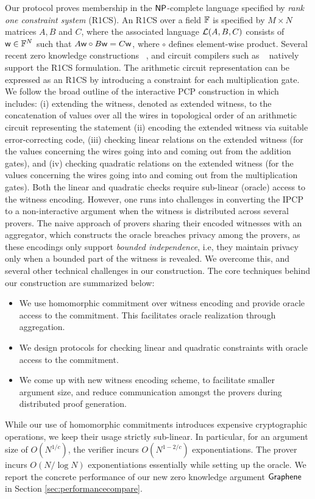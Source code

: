 Our protocol proves membership in the $\mathsf{NP}$-complete
language specified by {\em rank one constraint system} (R1CS). An R1CS over a
field $\mathbb{F}$ is specified by $M\times N$ matrices $A,B$ and $C$, where the
associated language $\mathcal{L}(A,B,C)$ consists of $\mathsf{w}\in \mathbb{F}^N$ such that
$A\mathsf{w}\circ B\mathsf{w}=C\mathsf{w}$, where $\circ$ defines element-wise product. Several
recent zero knowledge constructions ~\cite{Groth16,aurora,marlin}, and 
circuit compilers such as ~\cite{zokrates} natively support the R1CS formulation. 
The arithmetic circuit representation can  be
expressed as an R1CS by introducing a constraint for each multiplication gate.
We follow the broad outline of the interactive PCP
construction in \cite{ligero} which includes: (i) extending the witness, denoted as extended witness, to the concatenation of values over all the wires in topological order of an arithmetic circuit  representing the statement   (ii) encoding the extended witness via suitable
error-correcting code, (iii) checking linear relations on the extended witness (for the values concerning the wires going into and coming out from the addition gates), and
(iv) checking quadratic relations on
the extended witness  (for the values concerning the wires going into and coming out from the multiplication gates). Both the linear and quadratic checks require sub-linear (oracle) access to the 
witness encoding.
However, one runs into 
challenges in converting the IPCP to a non-interactive
argument when the witness is distributed across several provers. The naive
approach of provers sharing their encoded witnesses with an aggregator, which
constructs the oracle breaches privacy among the provers, as these encodings
only support {\em bounded independence}, i.e, they maintain privacy only when a
bounded part of the witness is revealed. We overcome this, and several other
technical challenges in our construction. The core techniques behind our
construction are summarized below:
\begin{itemize}
\item We use homomorphic commitment over witness encoding and provide oracle
access to the commitment. This facilitates oracle realization through
aggregation.
\item We design protocols for checking linear and quadratic constraints
with oracle access to the commitment.
\item We come up with new witness encoding scheme, to facilitate smaller
argument size, and reduce communication amongst the provers during distributed proof
generation.
\end{itemize}
While our use of homomorphic commitments introduces expensive cryptographic
operations, we keep their usage strictly sub-linear. In particular, for an
argument size of $O(N^{1/c})$, the verifier 
incurs $O(N^{1-2/c})$ exponentiations. The prover incurs
$O(N/\log N)$ exponentiations essentially while
setting up the oracle. We report the concrete performance of our new zero
knowledge argument $\textsf{Graphene}$ in Section
\ref{sec:performancecompare}.

